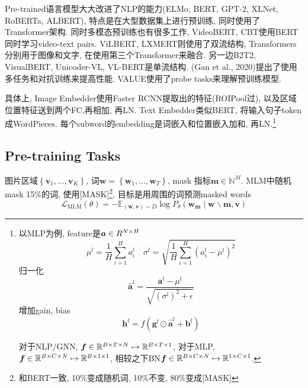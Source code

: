 \documentclass{article}
\begin{document}
Pre-trained语言模型大大改进了NLP的能力(ELMo, BERT, GPT-2, XLNet, RoBERTa, ALBERT), 特点是在大型数据集上进行预训练, 同时使用了Transformer架构. 同时多模态预训练也有很多工作, VideoBERT, CBT使用BERT同时学习video-text pairs. ViLBERT, LXMERT则使用了双流结构, Transformers分别用于图像和文字, 在使用第三个Transformer来融合. 另一边B2T2, VisualBERT, Unicoder-VL, VL-BERT是单流结构. (Gan et al., 2020)提出了使用多任务和对抗训练来提高性能. VALUE使用了probe tasks来理解预训练模型.

具体上, Image Embedder使用Faster RCNN提取出的特征(ROIPool过), 以及区域位置特征送到两个FC,再相加, 再LN. Text Embedder类似BERT, 将输入句子token成WordPieces. 每个subword的embedding是词嵌入和位置嵌入加和, 再LN.\footnote{

    以MLP为例, feature是$\boldsymbol{a} \in R^{N\times H}$
    \begin{equation}
        \mu^{l}=\frac{1}{H} \sum_{i=1}^{H} a_{i}^{l} \quad \sigma^{l}=\sqrt{\frac{1}{H} \sum_{i=1}^{H}\left(a_{i}^{l}-\mu^{l}\right)^{2}}
    \end{equation}
    归一化
    \begin{equation}
        \hat{\mathbf{a}}^{l}=\frac{\mathbf{a}^{l}-\mu^{l}}{\sqrt{\left(\sigma^{l}\right)^{2}+\epsilon}}
    \end{equation}
    增加gain, bias 
    \begin{equation}
        \mathbf{h}^{l}=f\left(\mathbf{g}^{l} \odot \hat{\mathbf{a}}^{l}+\mathbf{b}^{l}\right)
    \end{equation}

    对于NLP/GNN, $\boldsymbol{f}\in \mathbb{R}^{B\times T \times N}\mapsto \mathbb{R}^{B\times T \times 1}$, 对于MLP, $\boldsymbol{f}\in \mathbb{R}^{B\times C \times N}\mapsto \mathbb{R}^{B\times 1\times 1}$,
    相较之下BN$\boldsymbol{f}\in \mathbb{R}^{B\times C \times N}\mapsto \mathbb{R}^{1\times C \times 1}$.
}

\subsection{Pre-training Tasks}

 图片区域$\left\{\mathbf{v}_{1}, \ldots, \mathbf{v}_{K}\right\}$, 词$\mathbf{w}=\left\{\mathbf{w}_{1}, \ldots, \mathbf{w}_{T}\right\}$, mask 指标$\mathbf{m} \in \mathbb{N}^{M}$. 
MLM中随机mask 15\%的词, 使用[MASK]\footnote{
    和BERT一致, 10\%变成随机词, 10\%不变, 80\%变成[MASK]
}. 目标是用周围的词预测masked words
\begin{equation}
    \mathcal{L}_{\mathrm{MLM}}(\theta)=-\mathbb{E}_{(\mathbf{w}, \mathbf{v}) \sim D} \log P_{\theta}\left(\mathbf{w}_{\mathbf{m}} \mid \mathbf{w} \backslash \mathbf{m}, \mathbf{v}\right)
\end{equation}
\end{document}
